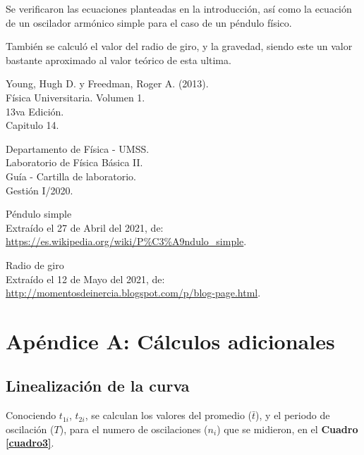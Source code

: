 \documentclass[letter,11pt]{article}
\begin{document}
Se verificaron las ecuaciones planteadas en la introducción, así como la
ecuación de un oscilador armónico simple para el caso de un péndulo físico.

También se calculó el valor del radio de giro, y la gravedad, siendo este un
valor bastante aproximado al valor teórico de esta ultima.

\begin{thebibliography}{99}

 Young, Hugh D. y Freedman, Roger A. (2013).\\
Física Universitaria. Volumen 1.\\
13va Edición.\\
Capitulo 14.

 Departamento de Física - UMSS.\\
Laboratorio de Física Básica II.\\
Guía - Cartilla de laboratorio.\\
Gestión I/2020.

 Péndulo simple \\
Extraído el 27 de Abril del 2021, de: \\
\url{https://es.wikipedia.org/wiki/P%C3%A9ndulo_simple}.

 Radio de giro \\
Extraído el 12 de Mayo del 2021, de: \\
\url{http://momentosdeinercia.blogspot.com/p/blog-page.html}.

\end{thebibliography}

\newpage
\section*{Apéndice A: Cálculos adicionales}

\subsection{Linealización de la curva}

Conociendo $t_{1i}$, $t_{2i}$, se calculan los valores del promedio ($\bar{t}$),
y el periodo de oscilación ($T$), para el numero de oscilaciones ($n_i$) que se
midieron, en el \textbf{Cuadro \ref{cuadro3}}.
\end{document}

